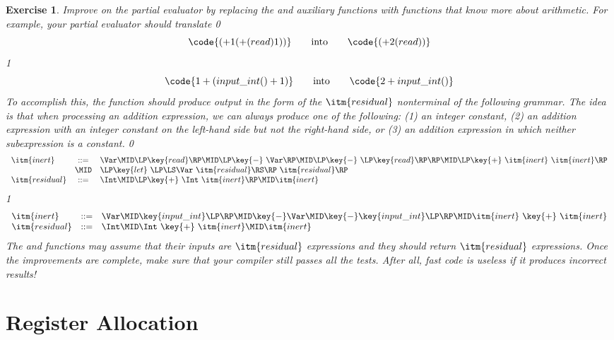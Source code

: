\documentclass[7x10]{TimesAPriori_MIT}%
\def\racketEd{0}
\def\pythonEd{1}
\def\edition{0}
\newtheorem{exercise}[theorem]{Exercise}
\numberwithin{theorem}{chapter}
\numberwithin{definition}{chapter}
\numberwithin{equation}{chapter}
\begin{document}
\begin{exercise}
\normalfont\normalsize

Improve on the partial evaluator by replacing the  and
 auxiliary functions with functions that know more about
arithmetic. For example, your partial evaluator should translate
{\if\edition\racketEd
\[
\code{(+ 1 (+ (read) 1))} \qquad \text{into} \qquad
\code{(+ 2 (read))}
\]
\fi}
{\if\edition\pythonEd
\[
\code{1 + (input\_int() + 1)} \qquad \text{into} \qquad
\code{2 + input\_int()}
\]
\fi}
%
To accomplish this, the  function should produce output
in the form of the $\itm{residual}$ nonterminal of the following
grammar. The idea is that when processing an addition expression, we
can always produce one of the following: (1) an integer constant, (2)
an addition expression with an integer constant on the left-hand side
but not the right-hand side, or (3) an addition expression in which
neither subexpression is a constant.
%
{\if\edition\racketEd
\[
\begin{array}{lcl}
  \itm{inert} &::=& \Var
    \MID \LP\key{read}\RP
    \MID \LP\key{-} ~\Var\RP
    \MID \LP\key{-} ~\LP\key{read}\RP\RP
    \MID \LP\key{+} ~ \itm{inert} ~ \itm{inert}\RP\\
    &\MID& \LP\key{let}~\LP\LS\Var~\itm{residual}\RS\RP~ \itm{residual} \RP \\  
  \itm{residual} &::=& \Int
    \MID \LP\key{+}~ \Int~ \itm{inert}\RP
    \MID \itm{inert} 
\end{array}
\]
\fi}
{\if\edition\pythonEd
\[
\begin{array}{lcl}
  \itm{inert} &::=& \Var
    \MID \key{input\_int}\LP\RP
    \MID \key{-} \Var
    \MID \key{-} \key{input\_int}\LP\RP
    \MID \itm{inert} ~ \key{+} ~ \itm{inert}\\
  \itm{residual} &::=& \Int
    \MID \Int ~ \key{+} ~ \itm{inert}
    \MID \itm{inert} 
\end{array}
\]
\fi}
The  and  functions may assume that their
inputs are $\itm{residual}$ expressions and they should return
$\itm{residual}$ expressions.  Once the improvements are complete,
make sure that your compiler still passes all the tests.  After
all, fast code is useless if it produces incorrect results!
\end{exercise}

\chapter{Register Allocation}
\label{ch:register-allocation-Lvar}
\setcounter{footnote}{0}
\end{document}

